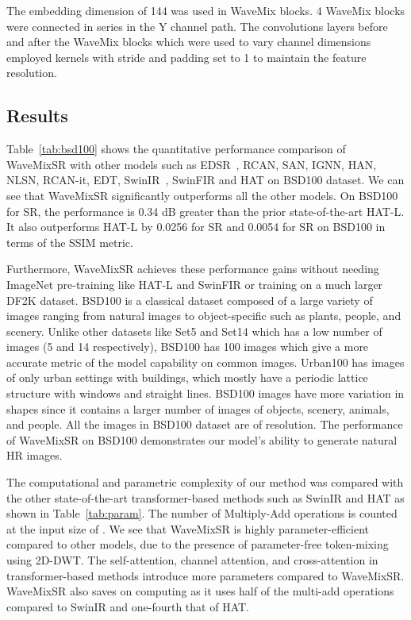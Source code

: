 \documentclass{article}
\begin{document}
The embedding dimension of 144 was used in WaveMix blocks. 4 WaveMix blocks were connected in series in the Y channel path. The convolutions layers before and after the WaveMix blocks which were used to vary channel dimensions employed  kernels with stride and padding set to 1 to maintain the feature resolution. 







\subsection{Results}

Table~\ref{tab:bsd100} shows the quantitative performance comparison of WaveMixSR with other models such as EDSR~\cite{lim2017enhanced}, RCAN, SAN, IGNN, HAN, NLSN, RCAN-it, EDT, SwinIR~\cite{liang2021swinir}, SwinFIR and HAT on BSD100 dataset. We can see that WaveMixSR significantly outperforms all the other models. On BSD100 for  SR, the performance is 0.34 dB greater than the prior state-of-the-art HAT-L. It also outperforms HAT-L by 0.0256 for  SR and 0.0054 for  SR on BSD100 in terms of the SSIM metric.


Furthermore, WaveMixSR achieves these performance gains without needing ImageNet pre-training like HAT-L and SwinFIR or training on a much larger DF2K dataset. BSD100 is a classical dataset composed of a large variety of images ranging from natural images to object-specific such as plants, people, and scenery. Unlike other datasets like Set5 and Set14 which has a low number of images (5 and 14 respectively), BSD100 has 100 images which give a more accurate metric of the model capability on common images. Urban100 has images of only urban settings with buildings, which mostly have a periodic lattice structure with windows and straight lines. BSD100 images have more variation in shapes since it contains a larger number of images of objects, scenery, animals, and people. All the images in BSD100 dataset are of  resolution. The performance of WaveMixSR on BSD100 demonstrates our model's ability to generate natural HR images. 

The computational and parametric complexity of our method was compared with the other state-of-the-art transformer-based methods such as SwinIR and HAT as shown in Table~\ref{tab:param}. The number of Multiply-Add operations is counted at the input size of . We see that WaveMixSR is highly parameter-efficient compared to other models, due to the presence of parameter-free token-mixing using 2D-DWT. The self-attention, channel attention, and cross-attention in transformer-based methods introduce  more parameters compared to WaveMixSR. WaveMixSR also saves on computing as it uses half of the multi-add operations compared to SwinIR and one-fourth that of HAT.
\end{document}
